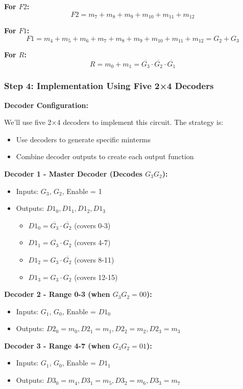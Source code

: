 \documentclass[12pt,a4paper]{article}
\begin{document}
\textbf{For $F2$:}
\[F2 = m_7 + m_8 + m_9 + m_{10} + m_{11} + m_{12}\]

\textbf{For $F1$:}
\[F1 = m_4 + m_5 + m_6 + m_7 + m_8 + m_9 + m_{10} + m_{11} + m_{12} = G_2 + G_3\]

\textbf{For $R$:}
\[R = m_0 + m_1 = \overline{G_3} \cdot \overline{G_2} \cdot \overline{G_1}\]

\newpage
\subsubsection{Step 4: Implementation Using Five 2×4 Decoders}

\textbf{Decoder Configuration:}

We'll use five 2×4 decoders to implement this circuit. The strategy is:
\begin{itemize}
  \item Use decoders to generate specific minterms
  \item Combine decoder outputs to create each output function
\end{itemize}

\textbf{Decoder 1 - Master Decoder (Decodes $G_3G_2$):}
\begin{itemize}
  \item Inputs: $G_3$, $G_2$, Enable = 1
  \item Outputs: $D1_0, D1_1, D1_2, D1_3$
  \begin{itemize}
    \item $D1_0 = \overline{G_3} \cdot \overline{G_2}$ (covers 0-3)
    \item $D1_1 = \overline{G_3} \cdot G_2$ (covers 4-7)
    \item $D1_2 = G_3 \cdot \overline{G_2}$ (covers 8-11)
    \item $D1_3 = G_3 \cdot G_2$ (covers 12-15)
  \end{itemize}
\end{itemize}

\textbf{Decoder 2 - Range 0-3 (when $G_3G_2 = 00$):}
\begin{itemize}
  \item Inputs: $G_1$, $G_0$, Enable = $D1_0$
  \item Outputs: $D2_0 = m_0, D2_1 = m_1, D2_2 = m_2, D2_3 = m_3$
\end{itemize}

\textbf{Decoder 3 - Range 4-7 (when $G_3G_2 = 01$):}
\begin{itemize}
  \item Inputs: $G_1$, $G_0$, Enable = $D1_1$
  \item Outputs: $D3_0 = m_4, D3_1 = m_5, D3_2 = m_6, D3_3 = m_7$
\end{itemize}
\end{document}
